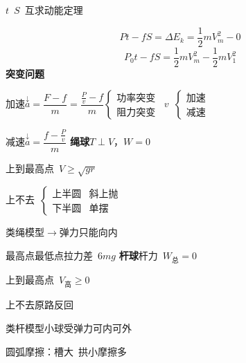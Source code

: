 $t$\ $S$\ 互求\quad 动能定理

\[
Pt-fS=\Delta E_k=\frac{1}{2}mV_m^2-0
\]
\[
P_0t-fS=\frac{1}{2}mV_m^2-\frac{1}{2}mV_1^2
\]
\textbf{突变问题}

加速\quad $\overset{\downarrow}{a}=\dfrac{F-f}{m}=\dfrac{\frac{P}{v}-f}{m}$\quad $\left\{\begin{array}{l}\text{功率突变}\\ \text{阻力突变}\end{array}\right.$\ $v$\ $\left\{\begin{array}{l}\text{加速}\\ \text{减速}\end{array}\right.$

减速\quad $\overset{\downarrow}{a}=\dfrac{f-\frac{P}{v}}{m}$
\textbf{绳球}\quad $T\perp V$，$W=0$

上到最高点\ $V\ge\sqrt{gr}$


上不去\ $\left\{\begin{array}{ll}\text{上半圆} & \text{斜上抛}\\ \text{下半圆} & \text{单摆}\end{array}\right.$

类绳模型$\to$弹力只能向内

最高点最低点拉力差\ $6mg$
\textbf{杆球}\quad 杆力\ $W_{\text{总}}=0$

上到最高点\ $V_{\text{高}}\ge0$

上不去\quad 原路反回 %

类杆模型\quad 小球受弹力可内可外


圆弧摩擦：槽大\ 拱小\quad 摩擦多

